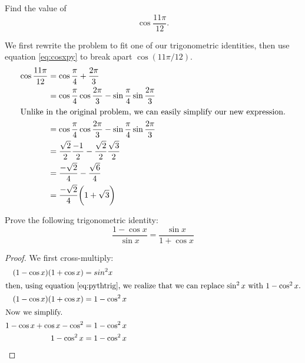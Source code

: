 \begin{ex}
  Find the value of
  \[ \cos{\frac{11 \pi}{12}} \text{.}\]
  \begin{sol}
    We first rewrite the problem to fit one of our trigonometric identities,
    then use equation \eqref{eq:cosxpy} to break apart $\cos{(11\pi /12)}$.
    \begin{align*}
      \cos{\frac{11 \pi}{12}}
      &=\cos{\frac{\pi}{4}+\frac{2 \pi}{3}}\\
      &=\cos{\frac{\pi}{4}} \cos{\frac{2\pi}{3}}
        -\sin\frac{\pi}{4} \sin\frac{2\pi}{3} \\
      \intertext{Unlike in the original problem, we can easily simplify our new expression.}
      &=\cos{\frac{\pi}{4}} \cos{\frac{2\pi}{3}}
        - \sin{\frac{\pi}{4}} \sin{\frac{2\pi}{3}}\\
      &= \frac{\sqrt 2}{2} \frac{-1}{2}
        -\frac{\sqrt 2}{2} \frac{\sqrt 3}{2}\\
      &=\frac{-\sqrt 2}{4}
        - \frac{\sqrt{6}}{4} \\
      &= \frac{-\sqrt 2}{4}\bigg(1+\sqrt 3\bigg)
    \end{align*}
  \end{sol}
\end{ex}
\begin{ex}
  Prove the following trigonometric identity:
  \[ \frac{1-\cos x}{\sin x}=\frac{\sin x}{1+\cos x} \]
  \begin{proof}
    We first cross-multiply:
    \begin{align*}
      \ (1-\cos x)(1+\cos x) &= sin^2 x \\
      \intertext{then, using equation \eqref{eq:pythtrig}, we realize that we can replace \(\sin^2 x\) with \(1-\cos^2 x\).}
       (1-\cos x)(1+\cos x) &= 1-\cos^2x\\
      \intertext{Now we simplify.}
      1-\cos x + \cos x -\cos^2 &= 1-\cos^2x \\
      1-\cos^2x &= 1-\cos^2x \qedhere
    \end{align*}
  \end{proof}
\end{ex}
